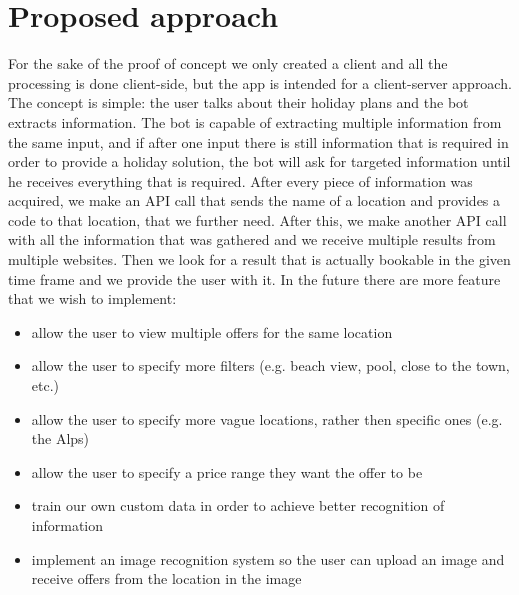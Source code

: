 \documentclass[runningheads,a4paper,11pt]{report}
\begin{document}
\chapter{Proposed approach}
\label{chapter:proposedApproach}
For the sake of the proof of concept we only created a client and all the processing is done client-side, but the app is intended for a client-server approach. 
\newline 
The concept is simple: the user talks about their holiday plans and the bot extracts information. The bot is capable of extracting multiple information from the same input, and if after one input there is still information that is required in order to provide a holiday solution, the bot will ask for targeted information until he receives everything that is required. 
\newline
After every piece of information was acquired, we make an API call that sends the name of a location and provides a code to that location, that we further need. After this, we make another API call with all the information that was gathered and we receive multiple results from multiple websites. Then we look for a result that is actually bookable in the given time frame and we provide the user with it.
\newline
In the future there are more feature that we wish to implement:
\begin{itemize}
    \item allow the user to view multiple offers for the same location
    \item allow the user to specify more filters (e.g. beach view, pool, close to the town, etc.)
    \item allow the user to specify more vague locations, rather then specific ones (e.g. the Alps)
    \item allow the user to specify a price range they want the offer to be
    \item train our own custom data in order to achieve better recognition of information
    \item implement an image recognition system so the user can upload an image and receive offers from the location in the image
\end{itemize}






\end{document}
